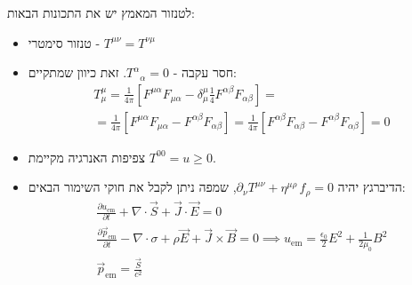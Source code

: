 \documentclass{tstextbook}
\begin{document}
\begin{proposition}
לטנזור המאמץ יש את התכונות הבאות:

  \begin{itemize}
    \item טנזור סימטרי - \(T^{\mu \nu}=T^{\nu \mu}\)
    \item חסר עקבה - \({T^{\alpha}}_{\alpha}=0\). זאת כיוון שמתקיים:
$$\begin{gather}T_{\mu}^{\mu}=\frac{1}{4\pi}\left[F^{\mu\alpha}F_{\mu\alpha}-\delta_{\mu}^{\mu}\frac{1}{4}F^{\alpha\beta}F_{\alpha\beta}\right] =\\=\frac{1}{4\pi}\left[F^{\mu\alpha}F_{\mu\alpha}-F^{\alpha\beta}F_{\alpha\beta}\right]=\frac{1}{4\pi}\left[F^{\alpha\beta}F_{\alpha\beta}-F^{\alpha\beta}F_{\alpha\beta}\right]=0
\end{gather}$$
    \item צפיפות האנרגיה מקיימת \(T^{00}=u\geq 0\).
    \item הדיברגץ יהיה \(\partial_{\nu}T^{\mu\nu}+\eta^{\mu\rho}\,f_{\rho}=0\), שמפה ניתן לקבל את חוקי השימור הבאים:
$$\begin{gather}{\frac{\partial u_{\mathrm{em}}}{\partial t}}+\nabla\cdot\vec{S}+\vec{J}\cdot\vec{E}=0 \\{\frac{\partial{\vec p}_{\mathrm{em}}}{\partial t}}-\nabla\cdot\sigma+\rho{\vec E}+{\vec J}\times{\vec B}=0\implies u_{\mathrm{em}}={\frac{\epsilon_{0}}{2}}E^{2}+{\frac{1}{2\mu_{0}}}B^{2} \\\vec{p}_{\mathrm{em}}={\frac{\vec{S}}{c^{2}}}
\end{gather}$$
  \end{itemize}
\end{proposition}
\end{document}
